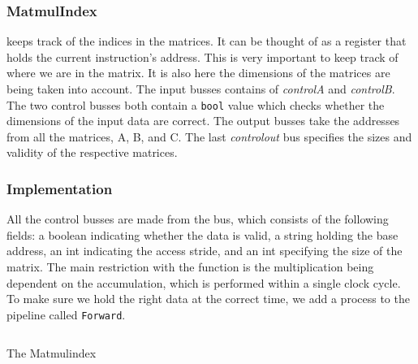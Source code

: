 \subsubsection{MatmulIndex}
 keeps track of the indices in the matrices. It can be thought of as a register that holds the current instruction's address. This is very important to keep track of where we are in the matrix. It is also here the dimensions of the matrices are being taken into account.
The input busses contains of \emph{controlA} and \emph{controlB}. The two control busses both contain a \texttt{bool} value which checks whether the dimensions of the input data are correct.
The output busses take the addresses from all the matrices, A, B, and C.
The last \emph{controlout} bus specifies the sizes and validity of the respective matrices.

\subsubsection{Implementation}

All the control busses are made from the  bus, which consists of the following fields: a boolean indicating whether the data is valid, a string holding the base address, an int indicating the access stride, and an int specifying the size of the matrix.
The main restriction with the  function is the multiplication being dependent on the accumulation, which is performed within a single clock cycle. To make sure we hold the right data at the correct time, we add a process to the pipeline called \texttt{Forward}.


\begin{listing}
  \inputminted{csharp}{codesnippets/matmulind.cs}
  \caption{The Matmulindex }
  \label{lst:datagenerator}
\end{listing}

